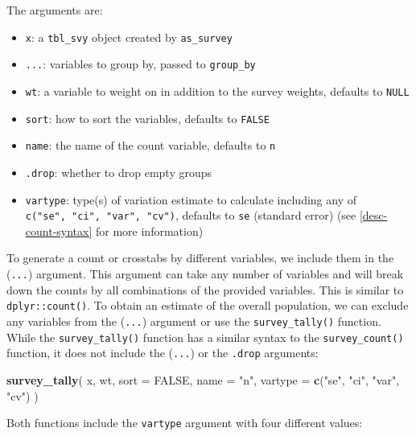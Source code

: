 \documentclass[
]{krantz}
\makeatletter
\newenvironment{Shaded}{\begin{snugshade}}{\end{snugshade}}
\newcommand{\AttributeTok}[1]{\textcolor[rgb]{0.27,0.27,0.27}{#1}}
\newcommand{\ConstantTok}[1]{\textcolor[rgb]{0.37,0.37,0.37}{#1}}
\newcommand{\FunctionTok}[1]{\textcolor[rgb]{0.27,0.27,0.27}{\textbf{#1}}}
\newcommand{\NormalTok}[1]{#1}
\newcommand{\StringTok}[1]{\textcolor[rgb]{0.5,0.5,0.5}{#1}}
\providecommand{\tightlist}{%
  \setlength{\itemsep}{0pt}\setlength{\parskip}{0pt}}
\newenvironment{kframe}{%
\medskip{}
\setlength{\fboxsep}{.8em}
 \def\at@end@of@kframe{}%
 \ifinner\ifhmode%
  \def\at@end@of@kframe{\end{minipage}}%
  \begin{minipage}{\columnwidth}%
 \fi\fi%
 \def\FrameCommand##1{\hskip\@totalleftmargin \hskip-\fboxsep
 \colorbox{shadecolor}{##1}\hskip-\fboxsep
     \hskip-\linewidth \hskip-\@totalleftmargin \hskip\columnwidth}%
 \MakeFramed {\advance\hsize-\width
   \@totalleftmargin\z@ \linewidth\hsize
   \@setminipage}}%
 {\par\unskip\endMakeFramed%
 \at@end@of@kframe}
\renewenvironment{Shaded}{\begin{kframe}}{\end{kframe}}
\makeatother
\begin{document}
The arguments are:

\begin{itemize}
\tightlist
\item
  \texttt{x}: a \texttt{tbl\_svy} object created by \texttt{as\_survey}
\item
  \texttt{...}: variables to group by, passed to \texttt{group\_by}
\item
  \texttt{wt}: a variable to weight on in addition to the survey weights, defaults to \texttt{NULL}
\item
  \texttt{sort}: how to sort the variables, defaults to \texttt{FALSE}
\item
  \texttt{name}: the name of the count variable, defaults to \texttt{n}
\item
  \texttt{.drop}: whether to drop empty groups
\item
  \texttt{vartype}: type(s) of variation estimate to calculate including any of \texttt{c("se",\ "ci",\ "var",\ "cv")}, defaults to \texttt{se} (standard error) (see \ref{desc-count-syntax} for more information)
\end{itemize}

To generate a count or crosstabs by different variables, we include them in the (\texttt{...}) argument. This argument can take any number of variables and will break down the counts by all combinations of the provided variables. This is similar to \texttt{dplyr::count()}. To obtain an estimate of the overall population, we can exclude any variables from the (\texttt{...}) argument or use the \texttt{survey\_tally()} function. While the \texttt{survey\_tally()} function has a similar syntax to the \texttt{survey\_count()} function, it does not include the (\texttt{...}) or the \texttt{.drop} arguments:

\begin{Shaded}
\begin{Highlighting}[]
\FunctionTok{survey\_tally}\NormalTok{(}
\NormalTok{  x,}
\NormalTok{  wt,}
  \AttributeTok{sort =} \ConstantTok{FALSE}\NormalTok{,}
  \AttributeTok{name =} \StringTok{"n"}\NormalTok{,}
  \AttributeTok{vartype =} \FunctionTok{c}\NormalTok{(}\StringTok{"se"}\NormalTok{, }\StringTok{"ci"}\NormalTok{, }\StringTok{"var"}\NormalTok{, }\StringTok{"cv"}\NormalTok{)}
\NormalTok{)}
\end{Highlighting}
\end{Shaded}

Both functions include the \texttt{vartype} argument with four different values:
\end{document}
